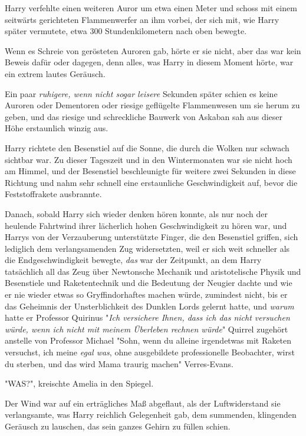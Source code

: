 {Harry verfehlte einen weiteren Auror um etwa einen Meter und schoss mit einem seitwärts gerichteten Flammenwerfer an ihm vorbei, der sich mit, wie Harry später vermutete, etwa 300 Stundenkilometern nach oben bewegte.

Wenn es Schreie von gerösteten Auroren gab, hörte er sie nicht, aber das war kein Beweis dafür oder dagegen, denn alles, was Harry in diesem Moment hörte, war ein extrem lautes Geräusch.

Ein paar \emph{ruhigere, wenn nicht sogar leisere} Sekunden später schien es keine Auroren oder Dementoren oder riesige geflügelte Flammenwesen um sie herum zu geben, und das riesige und schreckliche Bauwerk von Askaban sah aus dieser Höhe erstaunlich winzig aus.

Harry richtete den Besenstiel auf die Sonne, die durch die Wolken nur schwach sichtbar war. Zu dieser Tageszeit und in den Wintermonaten war sie nicht hoch am Himmel, und der Besenstiel beschleunigte für weitere zwei Sekunden in diese Richtung und nahm sehr schnell eine erstaunliche Geschwindigkeit auf, bevor die Feststoffrakete ausbrannte.

Danach, sobald Harry sich wieder denken hören konnte, als nur noch der heulende Fahrtwind ihrer lächerlich hohen Geschwindigkeit zu hören war, und Harrys von der Verzauberung unterstützte Finger, die den Besenstiel griffen, sich lediglich dem verlangsamenden Zug widersetzten, weil er sich weit schneller als die Endgeschwindigkeit bewegte, \emph{das} war der Zeitpunkt, an dem Harry tatsächlich all das Zeug über Newtonsche Mechanik und aristotelische Physik und Besenstiele und Raketentechnik und die Bedeutung der Neugier dachte und wie er nie wieder etwas so Gryffindorhaftes machen würde, zumindest nicht, bis er das Geheimnis der Unsterblichkeit des Dunklen Lords gelernt hatte, und \emph{warum} hatte er Professor Quirinus "\emph{Ich versichere Ihnen, dass ich das nicht versuchen würde, wenn ich nicht mit meinem Überleben rechnen würde}" Quirrel zugehört anstelle von Professor Michael "Sohn, wenn du alleine irgendetwas mit Raketen versuchst, ich meine \emph{egal was}, ohne ausgebildete professionelle Beobachter, wirst du sterben, und das wird Mama traurig machen" Verres-Evans.

"WAS?", kreischte Amelia in den Spiegel.

Der Wind war auf ein erträgliches Maß abgeflaut, als der Luftwiderstand sie verlangsamte, was Harry reichlich Gelegenheit gab, dem summenden, klingenden Geräusch zu lauschen, das sein ganzes Gehirn zu füllen schien.

}
